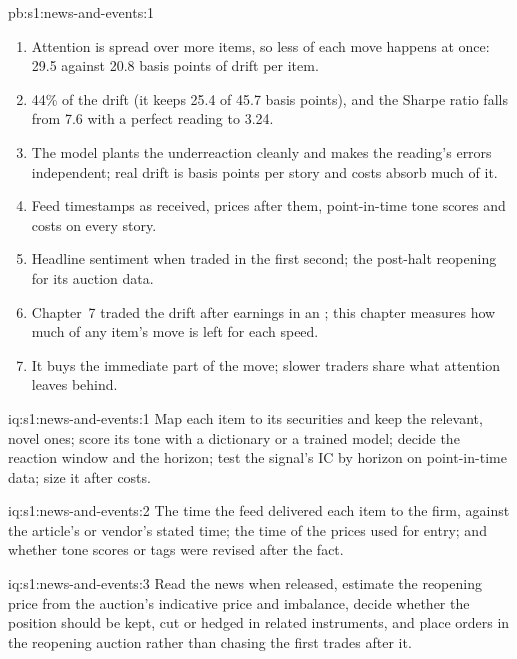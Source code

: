 \begin{solution}{pb:s1:news-and-events:1}
\begin{enumerate}
the next close; a daily trader with an imperfect text model captures 25.4 basis points per item, a Sharpe ratio of 3.24 after costs (1.80 on quiet days,
2.74 on busy ones).
\item Attention is spread over more items, so less of each move happens at once: 29.5 against 20.8 basis points of drift per item.
\item 44\% of the drift (it keeps 25.4 of 45.7 basis points), and the Sharpe ratio falls from 7.6 with a perfect reading to 3.24.
\item The model plants the underreaction cleanly and makes the reading's errors independent; real drift is basis points per story and costs absorb much of
it.
\item Feed timestamps as received, prices after them, point-in-time tone scores and costs on every story.
\item Headline sentiment when traded in the first second; the post-halt reopening for its auction data.
\item Chapter~7 traded the drift after earnings in an ; this chapter measures how much of any item's move is left for each speed.
\item It buys the immediate part of the move; slower traders share what attention leaves behind.
\end{enumerate}
\end{solution}

\begin{solution}{iq:s1:news-and-events:1}
Map each item to its securities and keep the relevant, novel ones; score its tone with a dictionary or a trained model; decide the reaction window and
the horizon; test the signal's IC by horizon on point-in-time data; size it after costs.
\end{solution}

\begin{solution}{iq:s1:news-and-events:2}
The time the feed delivered each item to the firm, against the article's or vendor's stated time; the time of the prices used for entry; and whether
tone scores or tags were revised after the fact.
\end{solution}

\begin{solution}{iq:s1:news-and-events:3}
Read the news when released, estimate the reopening price from the auction's indicative price and imbalance, decide whether the position should be kept,
cut or hedged in related instruments, and place orders in the reopening auction rather than chasing the first trades after it.
\end{solution}

